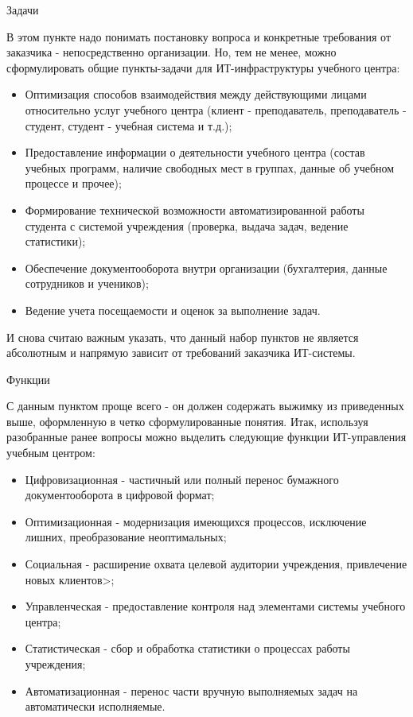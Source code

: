 Задачи

В этом пункте надо понимать постановку вопроса и конкретные требования от заказчика - непосредственно организации.
Но, тем не менее, можно сформулировать общие пункты-задачи для ИТ-инфраструктуры учебного центра:
\begin{itemize}
    \item Оптимизация способов взаимодействия между действующими лицами относительно услуг учебного центра (клиент - преподаватель, преподаватель - студент, студент - учебная система и т.д.);
    \item Предоставление информации о деятельности учебного центра (состав учебных программ, наличие свободных мест в группах, данные об учебном процессе и прочее);
    \item Формирование технической возможности автоматизированной работы студента с системой учреждения (проверка, выдача задач, ведение статистики);
    \item Обеспечение документооборота внутри организации (бухгалтерия, данные сотрудников и учеников);
    \item Ведение учета посещаемости и оценок за выполнение задач.
\end{itemize}

И снова считаю важным указать, что данный набор пунктов не является абсолютным и напрямую зависит от требований заказчика ИТ-системы.

Функции

С данным пунктом проще всего - он должен содержать выжимку из приведенных выше, оформленную в четко сформулированные понятия.
Итак, используя разобранные ранее вопросы можно выделить следующие функции ИТ-управления учебным центром:
\begin{itemize}
    \item Цифровизационная - частичный или полный перенос бумажного документооборота в цифровой формат;
    \item Оптимизационная - модернизация имеющихся процессов, исключение лишних, преобразование неоптимальных;
    \item Социальная - расширение охвата целевой аудитории учреждения, привлечение новых клиентов>;
    \item Управленческая - предоставление контроля над элементами системы учебного центра;
    \item Статистическая - сбор и обработка статистики о процессах работы учреждения;
    \item Автоматизационная - перенос части вручную выполняемых задач на автоматически исполняемые.
\end{itemize}

